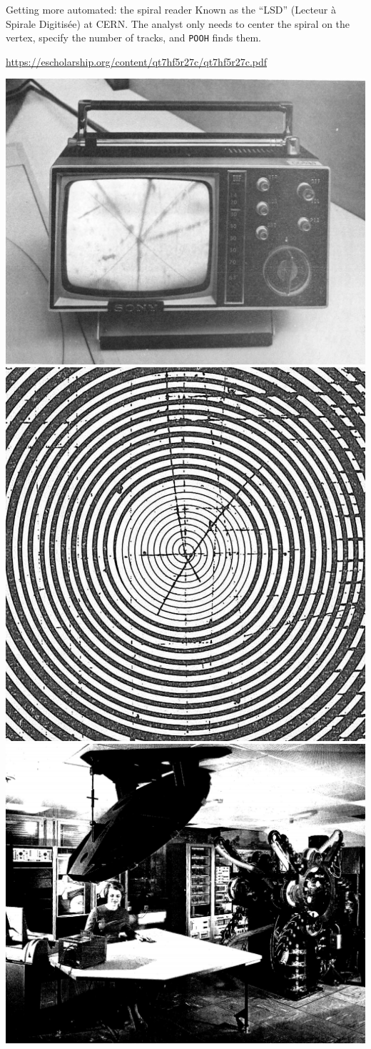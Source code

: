 \documentclass[aspectratio=169]{beamer}
\begin{document}
\begin{frame}{Getting more automated: the spiral reader}
\vspace{0.35 cm}
Known as the ``LSD'' (Lecteur \`a Spirale Digitis\'ee) at CERN. The analyst only needs to center the spiral on the vertex, specify the number of tracks, and {\tt POOH} finds them.

\small
\vspace{0.2 cm}
\textcolor{blue}{\url{https://escholarship.org/content/qt7hf5r27c/qt7hf5r27c.pdf}}

\vspace{0.5 cm}
\includegraphics[height=3 cm]{spiral-reader-2.jpg}\hspace{0.2 cm}\includegraphics[height=4.5 cm]{spiral-reader-1.jpg}\hspace{0.2 cm}\includegraphics[height=4.5 cm]{spiral-reader-3.jpg}

\end{frame}
\end{document}
